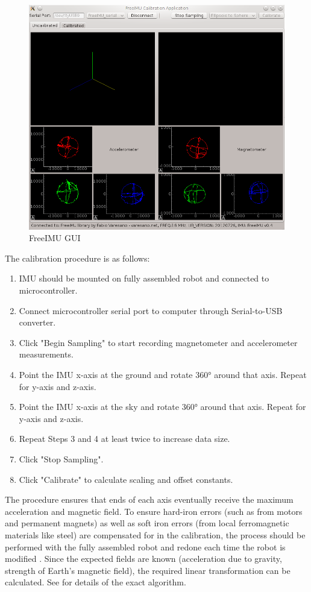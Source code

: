 \begin{figure}[H]   %
	\centering \includegraphics[width=6in, keepaspectratio]{figures/cal_gui.png}
	\caption{FreeIMU GUI \cite{freeimu}}\label{fig:cal_gui}
\end{figure}

The calibration procedure is as follows:
\begin{enumerate}
	\item \ssp IMU should be mounted on fully assembled robot and connected to microcontroller.
	\item \ssp Connect microcontroller serial port to computer through Serial-to-USB converter.
	\item \ssp Click "Begin Sampling" to start recording magnetometer and accelerometer measurements.
	\item \ssp Point the IMU x-axis at the ground and rotate \ang{360} around that axis. Repeat for y-axis and z-axis.
	\item \ssp Point the IMU x-axis at the sky and rotate \ang{360} around that axis. Repeat for y-axis and z-axis.
	\item \ssp Repeat Steps 3 and 4 at least twice to increase data size.
	\item \ssp Click "Stop Sampling".
	\item \ssp Click "Calibrate" to calculate scaling and offset constants.
\end{enumerate}

The procedure ensures that ends of each axis eventually receive the maximum acceleration and magnetic field. To ensure hard-iron errors (such as from motors and permanent magnets) as well as soft iron errors (from local ferromagnetic materials like steel) are compensated for in the calibration, the process should be performed with the fully assembled robot and redone each time the robot is modified \cite{hard_soft_correction}. Since the expected fields are known (acceleration due to gravity, strength of Earth's magnetic field), the required linear transformation can be calculated. See \cite{freeimu} for details of the exact algorithm.

